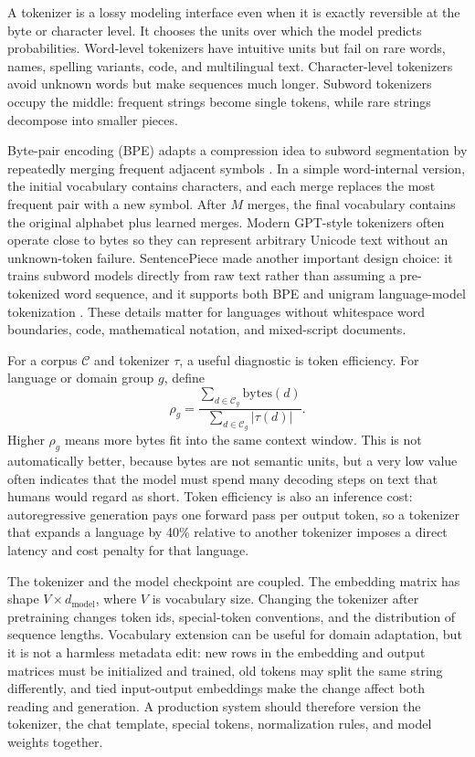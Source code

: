 A tokenizer is a lossy modeling interface even when it is exactly reversible at the byte or character level. It chooses the units over which the model predicts probabilities. Word-level tokenizers have intuitive units but fail on rare words, names, spelling variants, code, and multilingual text. Character-level tokenizers avoid unknown words but make sequences much longer. Subword tokenizers occupy the middle: frequent strings become single tokens, while rare strings decompose into smaller pieces.

Byte-pair encoding (BPE) adapts a compression idea to subword segmentation by repeatedly merging frequent adjacent symbols \cite{sennrich2016neural}. In a simple word-internal version, the initial vocabulary contains characters, and each merge replaces the most frequent pair with a new symbol. After $M$ merges, the final vocabulary contains the original alphabet plus learned merges. Modern GPT-style tokenizers often operate close to bytes so they can represent arbitrary Unicode text without an unknown-token failure. SentencePiece made another important design choice: it trains subword models directly from raw text rather than assuming a pre-tokenized word sequence, and it supports both BPE and unigram language-model tokenization \cite{kudo2018sentencepiece}. These details matter for languages without whitespace word boundaries, code, mathematical notation, and mixed-script documents.

For a corpus $\mathcal{C}$ and tokenizer $\tau$, a useful diagnostic is token efficiency. For language or domain group $g$, define
\begin{equation}
  \rho_g = \frac{\sum_{d\in \mathcal{C}_g} \mathrm{bytes}(d)}
                 {\sum_{d\in \mathcal{C}_g} |\tau(d)|}.
\end{equation}
Higher $\rho_g$ means more bytes fit into the same context window. This is not automatically better, because bytes are not semantic units, but a very low value often indicates that the model must spend many decoding steps on text that humans would regard as short. Token efficiency is also an inference cost: autoregressive generation pays one forward pass per output token, so a tokenizer that expands a language by 40\% relative to another tokenizer imposes a direct latency and cost penalty for that language.

The tokenizer and the model checkpoint are coupled. The embedding matrix has shape $V \times d_{\mathrm{model}}$, where $V$ is vocabulary size. Changing the tokenizer after pretraining changes token ids, special-token conventions, and the distribution of sequence lengths. Vocabulary extension can be useful for domain adaptation, but it is not a harmless metadata edit: new rows in the embedding and output matrices must be initialized and trained, old tokens may split the same string differently, and tied input-output embeddings make the change affect both reading and generation. A production system should therefore version the tokenizer, the chat template, special tokens, normalization rules, and model weights together.

